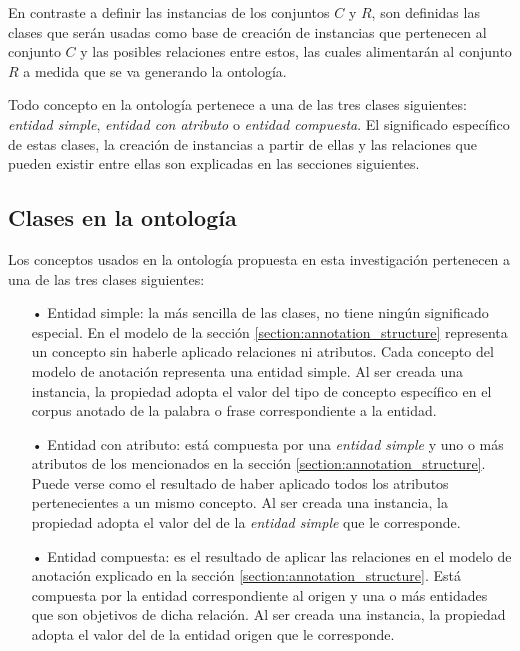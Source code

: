En contraste a definir las instancias de los conjuntos $C$ y $R$, son definidas las clases que serán usadas como base de creación de instancias que pertenecen al conjunto $C$ y las posibles relaciones entre estos, las cuales alimentarán al conjunto $R$ a medida que se va generando la ontología.

Todo concepto en la ontología pertenece a una de las tres clases siguientes: \textit{entidad simple}, \textit{entidad con atributo} o \textit{entidad compuesta}. El significado específico de estas clases, la creación de instancias a partir de ellas y las relaciones que pueden existir entre ellas son explicadas en las secciones siguientes.

\vspace{-0.1in}
\subsection{Clases en la ontología}
\vspace{-0.1in}
Los conceptos usados en la ontología propuesta en esta investigación pertenecen a una de las tres clases siguientes:

\vspace{-0.1in}
\begin{itemize}
	\item[•] Entidad simple: la más sencilla de las clases, no tiene ningún significado especial. En el modelo de la sección \ref{section:annotation_structure} representa un concepto sin haberle aplicado relaciones ni atributos. Cada concepto del modelo de anotación representa una entidad simple. Al ser creada una instancia, la propiedad  adopta el valor del tipo de concepto específico en el corpus anotado de la palabra o frase correspondiente a la entidad.
	\item[•] Entidad con atributo: está compuesta por una \textit{entidad simple} y uno o más atributos de los mencionados en la sección \ref{section:annotation_structure}. Puede verse como el resultado de haber aplicado todos los atributos pertenecientes a un mismo concepto. Al ser creada una instancia, la propiedad  adopta el valor del  de la \textit{entidad simple} que le corresponde.
	\item[•] Entidad compuesta: es el resultado de aplicar las relaciones en el modelo de anotación explicado en la sección \ref{section:annotation_structure}. Está compuesta por la entidad correspondiente al origen y una o más entidades que son objetivos de dicha relación. Al ser creada una instancia, la propiedad  adopta el valor del  de la entidad origen que le corresponde.
\end{itemize}

